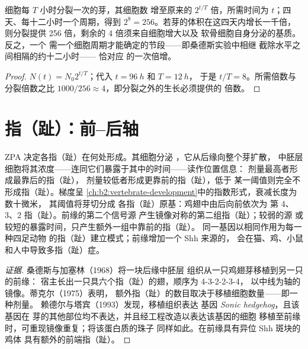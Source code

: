 \begin{theorem}[分裂带来的生长]\label{thm:b2:limb-organogenesis:growth}
细胞每 $T$ 小时分裂一次的芽，其细胞数
增至原来的 $2^{t/T}$ 倍，所需时间为 $t$；四天、每十二小时一个周期，得到
$2^{8} = 256$。若芽的体积在这四天内增长一千倍，
则分裂提供 256 倍，剩余的
4 倍须来自细胞增大以及
软骨细胞自身分泌的基质。反之，一个
需一个细胞周期才能确定的节段——即桑德斯实验中相继
截除水平之间相隔的约十二小时——
恰对应
的一次倍增。
\end{theorem}
\begin{proof}
$N(t) = N_0 2^{t/T}$；代入 $t = \qty{96}{h}$ 和 $T = \qty{12}{h}$，
于是 $t/T = 8$。所需倍数与分裂倍数之比
$1000/256 \approx 4$，即分裂之外的生长必须提供的
倍数。
\end{proof}

\section{指（趾）：前–后轴}

\begin{proposition}[极性活性区]\label{prop:b2:limb-organogenesis:zpa}
ZPA 决定各指（趾）在何处形成。其细胞分泌 ，它从后缘向整个芽扩散，
中胚层细胞将其浓度——连同它们暴露于其中的时间——读作位置信息：
剂量最高者形成最靠后的指（趾），
剂量较低者形成更靠前的指（趾），低于
某一阈值则完全不形成指（趾）。梯度呈
\cref{ch:b2:vertebrate-development}中的指数形式，衰减长度为数十微米，
其阈值将芽切分成
各指（趾）原基：鸡翅中由后向前依次为
第 4、3、2 指（趾）。前缘的第二个信号源
产生镜像对称的第二组指（趾）；较弱的源
或较短的暴露时间，只产生额外一组中靠前的指（趾）。
同一基因以相同作用为每一种四足动物
的指（趾）建立模式；前缘增加一个 Shh 来源的，
会在猫、鸡、小鼠和人中导致多指（趾）症。
\end{proposition}
\begin{proof}[证据]
桑德斯与加塞林（1968）将一块后缘中胚层
组织从一只鸡翅芽移植到另一只的前缘：
宿主长出一只具六个指（趾）的翅，顺序为 4-3-2-2-3-4，
以中线为轴的镜像。蒂克尔（1975）表明，
额外指（趾）的数目取决于移植细胞数量——即一种剂量。
赖德尔与塔宾（1993）发现，移植组织表达
基因 \emph{Sonic hedgehog}，且该基因在
芽的其他部位均不表达，并且经工程改造以表达该基因的细胞
移植至前缘时，可重现镜像重复；将该蛋白质的珠子
同样如此。在前缘具有异位 Shh 斑块的鸡体
具有额外的前端指（趾）。
\end{proof}

